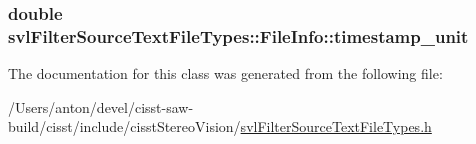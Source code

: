 \subsubsection[{timestamp\+\_\+unit}]{\setlength{\rightskip}{0pt plus 5cm}double svl\+Filter\+Source\+Text\+File\+Types\+::\+File\+Info\+::timestamp\+\_\+unit}\label{classsvl_filter_source_text_file_types_1_1_file_info_aa6d0b04ba4092e788a532c3d88a0420e}


The documentation for this class was generated from the following file\+:\begin{DoxyCompactItemize}
\item 
/\+Users/anton/devel/cisst-\/saw-\/build/cisst/include/cisst\+Stereo\+Vision/\hyperlink{svl_filter_source_text_file_types_8h}{svl\+Filter\+Source\+Text\+File\+Types.\+h}\end{DoxyCompactItemize}
